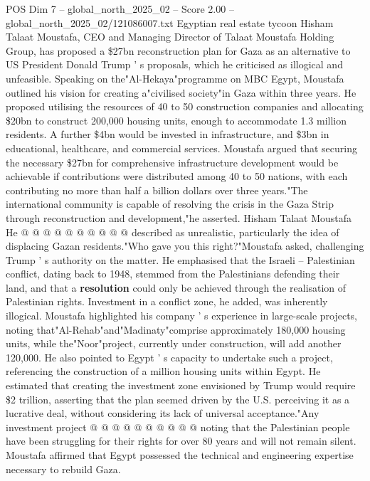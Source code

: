 \begin{textsample}{POS Dim 7 – global\_north\_2025\_02 – Score 2.00 – global\_north\_2025\_02/121086007.txt}  \label{ex:f7_pos_387}
Egyptian real estate tycoon Hisham Talaat Moustafa, CEO and Managing Director of Talaat Moustafa Holding Group, has proposed a \$27bn reconstruction plan for Gaza as an alternative to US President Donald Trump ' s proposals, which he criticised as illogical and unfeasible.
Speaking on the"Al-Hekaya"programme on MBC Egypt, Moustafa outlined his vision for creating a"civilised society"in Gaza within three years.
He proposed utilising the resources of 40 to 50 construction companies and allocating \$20bn to construct 200,000 housing units, enough to accommodate 1.3 million residents.
A further \$4bn would be invested in infrastructure, and \$3bn in educational, healthcare, and commercial services.
Moustafa argued that securing the necessary \$27bn for comprehensive infrastructure development would be achievable if contributions were distributed among 40 to 50 nations, with each contributing no more than half a billion dollars over three years."The international community is capable of resolving the crisis in the Gaza Strip through reconstruction and development,"he asserted.
Hisham Talaat Moustafa He @ @ @ @ @ @ @ @ @ @ described as unrealistic, particularly the idea of displacing Gazan residents."Who gave you this right?"Moustafa asked, challenging Trump ' s authority on the matter.
He emphasised that the Israeli -- Palestinian conflict, dating back to 1948, stemmed from the Palestinians defending their land, and that a \textbf{resolution} could only be achieved through the realisation of Palestinian rights.
Investment in a conflict zone, he added, was inherently illogical.
Moustafa highlighted his company ' s experience in large-scale projects, noting that"Al-Rehab"and"Madinaty"comprise approximately 180,000 housing units, while the"Noor"project, currently under construction, will add another 120,000.
He also pointed to Egypt ' s capacity to undertake such a project, referencing the construction of a million housing units within Egypt.
He estimated that creating the investment zone envisioned by Trump would require \$2 trillion, asserting that the plan seemed driven by the U.S. perceiving it as a lucrative deal, without considering its lack of universal acceptance."Any investment project @ @ @ @ @ @ @ @ @ @ noting that the Palestinian people have been struggling for their rights for over 80 years and will not remain silent.
Moustafa affirmed that Egypt possessed the technical and engineering expertise necessary to rebuild Gaza.

\end{textsample}
